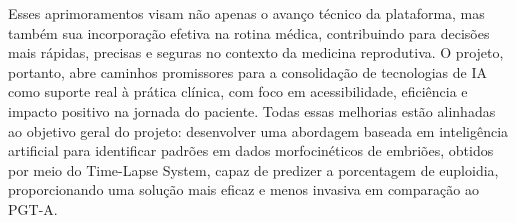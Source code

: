 Esses aprimoramentos visam não apenas o avanço técnico da plataforma, mas também sua incorporação efetiva na rotina médica, contribuindo para decisões mais rápidas, precisas e seguras no contexto da medicina reprodutiva. O projeto, portanto, abre caminhos promissores para a consolidação de tecnologias de IA como suporte real à prática clínica, com foco em acessibilidade, eficiência e impacto positivo na jornada do paciente. Todas essas melhorias estão alinhadas ao objetivo geral do projeto: desenvolver uma abordagem baseada em inteligência artificial para identificar padrões em dados morfocinéticos de embriões, obtidos por meio do Time-Lapse System, capaz de predizer a porcentagem de euploidia, proporcionando uma solução mais eficaz e menos invasiva em comparação ao PGT-A.
